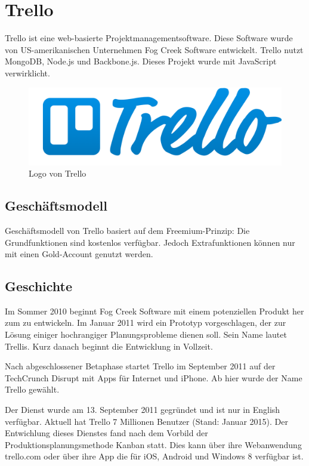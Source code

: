 \section{Trello}
Trello ist eine web-basierte Projektmanagementsoftware. Diese Software wurde von US-amerikanischen Unternehmen Fog Creek Software entwickelt. Trello nutzt MongoDB, Node.js und Backbone.js. Dieses Projekt wurde mit JavaScript verwirklicht.

\begin{figure}[h]
  \centering
    \includegraphics[width=\textwidth]{trello.png}
  \caption{Logo von Trello}
  \label{fig:trello}
\end{figure}
\subsection{Geschäftsmodell}
Geschäftsmodell von Trello basiert auf dem Freemium-Prinzip: Die Grundfunktionen sind kostenlos verfügbar. Jedoch Extrafunktionen können nur mit einen Gold-Account genutzt werden.
\subsection{Geschichte}
Im Sommer 2010 beginnt Fog Creek Software mit einem potenziellen Produkt her zum zu entwickeln. Im Januar 2011 wird ein Prototyp vorgeschlagen, der zur Lösung einiger hochrangiger Planungsprobleme dienen soll. Sein Name lautet Trellis. Kurz danach beginnt die Entwicklung in Vollzeit.

Nach abgeschlossener Betaphase startet Trello im September 2011 auf der TechCrunch Disrupt mit Apps für Internet und iPhone. Ab hier wurde der Name Trello gewählt.

Der Dienst wurde am 13. September 2011 gegründet und ist nur in English verfügbar. Aktuell hat Trello 7 Millionen Benutzer (Stand: Januar 2015). Der Entwichlung dieses Dienstes fand nach dem Vorbild der Produktionsplanungsmethode Kanban statt. Dies kann über ihre Webanwendung trello.com oder über ihre App die für iOS, Android und Windows 8 verfügbar ist.

